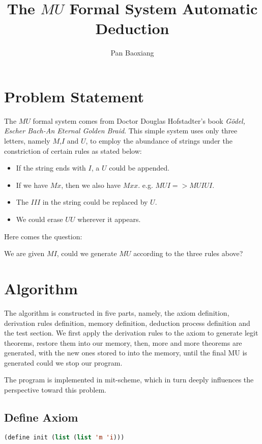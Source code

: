 \documentclass[11pt]{article}
\begin{document}
\title{The $MU$ Formal System Automatic Deduction}
\date{ }
\author{Pan Baoxiang }
\maketitle

\section*{Problem Statement}
The $MU$ formal system comes from Doctor Douglas Hofstadter's book \emph{
G{\"o}del, Escher Bach-An Eternal Golden Braid}. This simple system uses only three letters, namely $M$,$I$ and $U$, to employ the abundance of strings under the constriction of certain rules as stated below:
\begin{itemize}
\item If the string ends with $I$, a $U$ could be appended.
\item If we have $Mx$, then we also have $Mxx$. e.g. $MUI=> MUIUI$.
\item The $III$ in the string could be replaced by $U$.
\item We could erase $UU$ wherever it appears.
\end{itemize}

Here comes the question:

We are given $MI$, could we generate $MU$ according to the three rules above?
\section*{Algorithm}

The algorithm is constructed in five parts, namely, the axiom definition, derivation rules definition, memory definition, deduction process definition and the test section. We first apply the derivation rules to the axiom to generate legit theorems, restore them into our memory, then, more and more theorems are generated, with the new ones stored to into the memory, until the final MU is generated could we stop our program. 

The program is implemented in mit-scheme, which in turn deeply influences the perspective toward this problem. 

\subsection*{Define Axiom}
\begin{lstlisting}[language=lisp]
(define init (list (list 'm 'i)))
\end{lstlisting}
\end{document}
